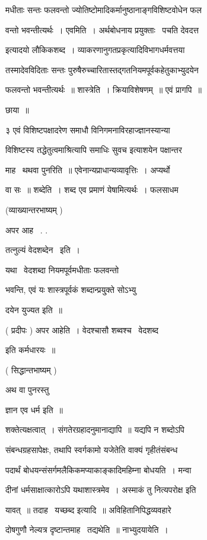 \documentclass[11pt, openany]{book}
\begin{document}
मधीताः सन्तः फलवन्तो ज्योतिष्टोमादिकर्मानुष्ठानाङ्गविशिष्टवोधेन फल \textendash\ 

वन्तो भवन्तीत्यर्थः~। एवमिति~। अर्थबोधनाय प्रयुक्ताः \textendash\ पचति देवदत्त 

इत्यादयो लौकिकशब्द~। व्याकरणानुगतप्रकृत्यादिविभागधर्मवत्तया 

तस्मादेवविदिताः सन्तः पुरुषैरुच्चारितास्तद्गतनियमपूर्वकहेतुकाभ्युदयेन 

फलवन्तो भवन्तीत्यर्थः~॥ शास्त्रेति~। क्रियाविशेषणम्~॥ एवं प्रागपि~॥


छाया~॥ 

३ एवं विशिष्टपक्षादरेण समाधौ विनिगमनाविरहाज्ज्ञानस्यान्या \textendash\ 

विशिष्टस्य तद्धेतुत्वमाश्रित्यापि समाधिः सुवच इत्याशयेन पक्षान्तर \textendash\ 

माह \textendash\ थथवा पुनरिति~॥ एवेनान्यप्राधान्यव्यावृत्तिः~। अप्यर्थो 

वा सः~॥ शब्देति~। शब्द एव प्रमाणं येषामित्यर्थः~। फलसाधम \textendash\ 





(व्याख्यान्तरभाष्यम् ) 

अपर आह \textendash\ . . 

तत्नुल्यं वेदशब्देन \textendash\ इति~। 

यथा \textendash\ वेदशब्दा नियमपूर्वमधीताः फलवन्तो 

भवन्ति, एवं यः शास्त्रपूर्वकं शब्दान्प्रयु्क्ते सोऽभ्यु \textendash\ 

दयेन युज्यत इति~॥ 

( प्रदीपः ) अपर आहेति~। वेदश्चासौ शब्वश्च \textendash\ वेदशब्द 

इति कर्मधारयः~॥ 

( सिद्धान्तभाष्यम् ) 

अथ वा पुनरस्तु \textendash\ 

ज्ञान एव धर्म इति~॥ 

शक्तेत्यक्षत्वात्~। संगतेरग्रहादनुमानाद्यापि~॥ यद्यपि न शब्दोऽपि 

संबन्धग्रहसापेक्षः, तथापि स्वर्गकामो यजेतेति वाक्यं गृहीतंसंबन्ध \textendash\ 

पदार्थं बोधयन्संसर्गमलैकिकमप्याकाङ्कादिमहिम्ना बोधयति~। मन्वा \textendash\ 

दीनां धर्मसाक्षात्कारोऽपि यथाशास्त्रमेव~। अस्माकं तु नित्यपरोक्ष इति 

यावत्~॥ तदाह \textendash\ यच्छब्द इत्यादि~॥ अविहितानिपिद्धव्यवहारे 

दोषगुणौ नेल्यत्र दृष्टान्तमाह \textendash\ तद्यथेति~॥ नाभ्युदयायेति~। 
\end{document}
